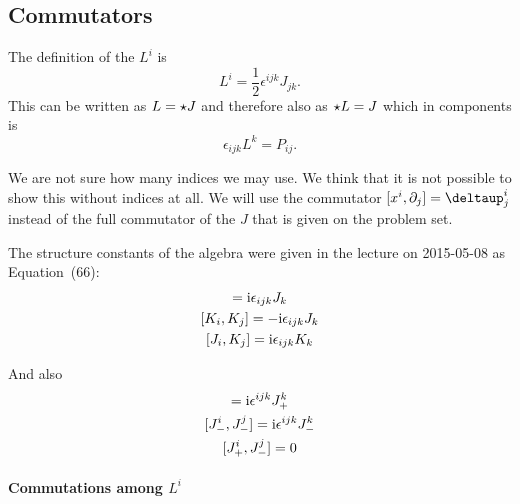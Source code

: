 \documentclass[11pt, english, fleqn, DIV=15, headinclude, BCOR=1cm]{scrartcl}
\begin{document}
\subsection{Commutators}

The definition of the $L^i$ is
\[
    L^i = \frac12 \epsilon^{ijk} J_{jk}.
\]
This can be written as $L = \star J$ and therefore also as $\star L = J$
which in components is
\[
    \epsilon_{ijk} L^k = P_{ij}.
\]

We are not sure how many indices we may use. We think that it is not possible
to show this without indices at all. We will use the commutator $[x^i,
\partial_j] = \deltaup^i_j$ instead of the full commutator of the $J$ that is
given on the problem set.

The structure constants of the algebra were given in the lecture on 2015-05-08
as Equation~(66):
\begin{gather*}
    [J_i, J_j] = \iup \epsilon_{ijk} J_k \\
    [K_i, K_j] = - \iup \epsilon_{ijk} J_k \\
    [J_i, K_j] = \iup \epsilon_{ijk} K_k
\end{gather*}

And also
\begin{gather*}
    [J_+^i, J_+^j] = \iup \epsilon^{ijk} J_+^k \\
    [J_-^i, J_-^j] = \iup \epsilon^{ijk} J_-^k \\
    [J_+^i, J_-^j] = 0
\end{gather*}

\paragraph{Commutations among $L^i$}
\end{document}
